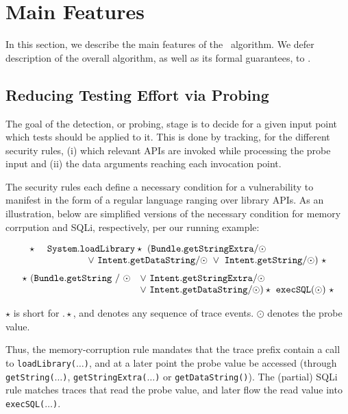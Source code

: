 \section{Main Features}\label{Se:corealg}

In this section, we describe the main features of the \Tool\ algorithm. We defer description of the overall algorithm, as well as its formal guarantees, to .

\subsection{Reducing Testing Effort via Probing}\label{Se:detectionSubsec}

The goal of the detection, or probing, stage is to decide for a given input point which tests should be applied to it. This is done by tracking, for the different security rules, (i) which relevant APIs are invoked while processing the probe input and (ii) the data arguments reaching each invocation point. 

The security rules each define a necessary condition for a vulnerability to manifest in the form of a regular language ranging over library APIs. As an illustration, below are simplified versions of the necessary condition for memory corrpution and SQLi, respectively, per our running example:

\begin{scriptsize}
$$
\begin{array}{rl}
	\star\ & {\tt System.loadLibrary}  
	\star\ ({\tt Bundle.getStringExtra / \odot} \\ & \hspace{1.5cm} \vee\ {\tt Intent.getDataString / \odot}\  
	\vee\ {\tt Intent.getString / \odot})\ \star
\end{array}
$$
$$
\begin{array}{rl}
	\star\ ({\tt Bundle.getString\ /\ \odot} & \vee\ {\tt Intent.getStringExtra / \odot} \\ 
	& \vee\ {\tt Intent.getDataString / \odot}) \star\ {\tt execSQL(\odot)}\ \star
\end{array}
$$
\end{scriptsize}
$\star$ is short for $. \star$, and denotes any sequence of trace events. $\odot$ denotes the probe value. 

Thus, the memory-corruption rule mandates that the trace prefix contain a call to {\tt loadLibrary($\ldots$)}, and at a later point the probe value be accessed (through {\tt getString($\ldots$)}, {\tt getStringExtra($\ldots$)} or {\tt getDataString()}). The (partial) SQLi rule matches traces that read the probe value, and later flow the read value into {\tt execSQL($\ldots$)}.

